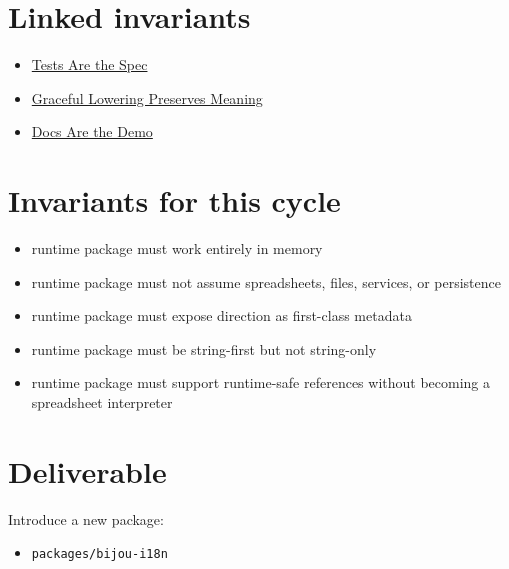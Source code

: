 \section{Linked invariants}\label{record-188-linked-invariants}

\begin{itemize}
\tightlist
\item
  \href{https://github.com/flyingrobots/bijou/blob/cbd70612140e7a450d764b3c7be1c6af878b99bc/docs/invariants/tests-are-the-spec.md}{Tests Are the Spec}
\item
  \href{https://github.com/flyingrobots/bijou/blob/cbd70612140e7a450d764b3c7be1c6af878b99bc/docs/invariants/graceful-lowering-preserves-meaning.md}{Graceful Lowering Preserves Meaning}
\item
  \href{https://github.com/flyingrobots/bijou/blob/cbd70612140e7a450d764b3c7be1c6af878b99bc/docs/invariants/docs-are-the-demo.md}{Docs Are the Demo}
\end{itemize}

\section{Invariants for this cycle}\label{record-188-invariants-for-this-cycle}

\begin{itemize}
\tightlist
\item
  runtime package must work entirely in memory
\item
  runtime package must not assume spreadsheets, files, services, or persistence
\item
  runtime package must expose direction as first-class metadata
\item
  runtime package must be string-first but not string-only
\item
  runtime package must support runtime-safe references without becoming a spreadsheet interpreter
\end{itemize}

\section{Deliverable}\label{record-188-deliverable}

Introduce a new package:

\begin{itemize}
\tightlist
\item
  \texttt{p\allowbreak{}a\allowbreak{}c\allowbreak{}k\allowbreak{}a\allowbreak{}g\allowbreak{}e\allowbreak{}s\allowbreak{}/\allowbreak{}b\allowbreak{}i\allowbreak{}j\allowbreak{}o\allowbreak{}u\allowbreak{}-\allowbreak{}i\allowbreak{}1\allowbreak{}8\allowbreak{}n}
\end{itemize}

